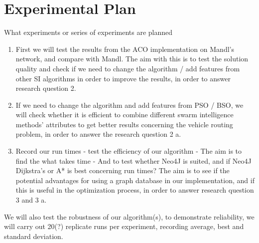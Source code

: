 \section{Experimental Plan}



What experiments or series of experiments are planned

\begin{enumerate}
\item First we will test the results from the ACO implementation on Mandl's network, and compare with Mandl. 
The aim with this is to test the solution quality and check if we need to change the algorithm / add features from other SI algorithms in order to improve the results, in order to answer research question 2.

\item If we need to change the algorithm and add features from PSO / BSO, we will check whether it is efficient to combine different swarm intelligence methods' attributes to get better results concerning the vehicle routing problem, in order to answer the research question 2 a.

\item Record our run times - test the efficiency of our algorithm - The aim is to find the what takes time - And to test whether Neo4J is suited, and if Neo4J Dijkstra's or A* is best concerning run times? The aim is to see if the potential advantages for using a graph database in our implementation, and if this is useful in the optimization process, in order to answer research question 3 and 3 a.

\end{enumerate}

We will also test the robustness of our algorithm(s), to demonstrate reliability, we will carry out 20(?) replicate runs per experiment, recording average, best and standard deviation. 


